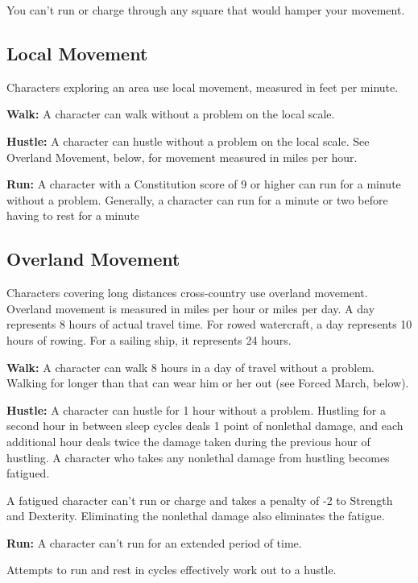 You can't run or charge through any square that would hamper your movement.

\subsection{Local Movement}

Characters exploring an area use local movement, measured in feet per minute.

\textbf{Walk:} A character can walk without a problem on the local scale.

\textbf{Hustle:} A character can hustle without a problem on the local scale. See 
Overland Movement, below, for movement measured in miles per hour.

\textbf{Run:} A character with a Constitution score of 9 or higher can run for 
a minute without a problem. Generally, a character can run for a minute or two 
before having to rest for a minute

\subsection{Overland Movement}

Characters covering long distances cross-country use overland movement. Overland 
movement is measured in miles per hour or miles per day. A day represents 8 hours 
of actual travel time. For rowed watercraft, a day represents 10 hours of rowing. 
For a sailing ship, it represents 24 hours.

\textbf{Walk:} A character can walk 8 hours in a day of travel without a problem. 
Walking for longer than that can wear him or her out (see Forced March, below).

\textbf{Hustle:} A character can hustle for 1 hour without a problem. Hustling 
for a second hour in between sleep cycles deals 1 point of nonlethal damage, and 
each additional hour deals twice the damage taken during the previous hour of hustling. 
A character who takes any nonlethal damage from hustling becomes fatigued.

A fatigued character can't run or charge and takes a penalty of -2 to Strength 
and Dexterity. Eliminating the nonlethal damage also eliminates the fatigue.

\textbf{Run:} A character can't run for an extended period of time.

Attempts to run and rest in cycles effectively work out to a hustle.

